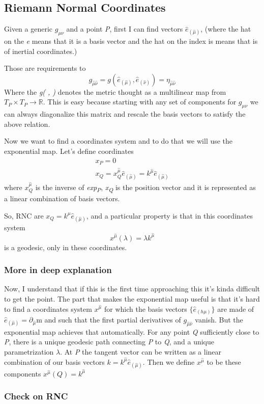 \subsection{Riemann Normal Coordinates}
Given a generic $g_{\mu \nu }$ and a point \emph{P}, first I can find vectors $\hat{e}_{\left( \hat{\mu } \right)}$, (where the hat on the \emph{e} means that it is a basis vector and the hat on the index is means that is of inertial coordinates.)\par
Those are requirements to 
\[
g_{\hat{\mu }\hat{\nu }} =  g\left( \hat{e}_{\left( \hat{\mu } \right)}, \hat{e}_{\left( \hat{\nu } \right)} \right) = \eta _{\hat{\mu }\hat{\nu }}
\]
Where the \emph{g( , )} denotes the metric thought as a multilinear map from $T_{P} \times T_{P} \to \mathbb{R}$. This is easy because starting with any set of components for $g_{\mu \nu }$ we can always diagonalize this matrix and rescale the basis vectors to satisfy the above relation.\par
Now we want to find a coordinates system and to do that we will use the exponential map.
Let's define coordinates 
\begin{gather*}
x_{P} = 0 \\
x_{Q} = x^{\hat{\mu }}_{Q} \hat{e}_{\left( \hat{\mu } \right)} = k^{\hat{\mu }} \hat{e}_{\left( \hat{\mu } \right)}
\end{gather*}
where $x^{\hat{\mu }}_{Q}$ is the inverse of \emph{exp\textsubscript{P}}, \emph{x\textsubscript{Q}} is the position vector and it is represented as a linear combination of basis vectors.\par
So, RNC are $x_{Q } = k^{\mu } \hat{e}_{\left( \hat{\mu } \right)}$, and a particular property is that in this coordinates system 
\[
x^{\hat{\mu }}\left( \lambda  \right) = \lambda k^{\hat{\mu }}
\]
is a geodesic, only in these coordinates.
\subsubsection{More in deep explanation}
Now, I understand that if this is the first time approaching this it's kinda difficult to get the point. 
The part that makes the exponential map useful is that it's hard to find a coordinates system $x^{\hat{\mu }}$ for which the basis vectors $\{ \hat{e}_{\left( h\mu  \right)}\}$ are made of $\hat{e}_{\left( \hat{\mu } \right)} = \partial_{\hat{\mu } }$m and such that the first partial derivatives of $g_{\hat{\mu }\hat{\nu }}$ vanish. But the exponential map achieves that automatically. For any point \emph{Q} sufficiently close to \emph{P}, there is a unique geodesic path connecting \emph{P} to \emph{Q}, and a unique parametrization $\lambda $. At \emph{P} the tangent vector can be written as a linear combination of our basis vectors $k = k^{\hat{\mu }} \hat{e}_{\left( \hat{\mu } \right)}$. Then we define $x^{\hat{\mu }}$ to be these components $x^{\hat{\mu }}\left( Q \right) = k^{\hat{\mu }}$

\subsubsection{Check on RNC}














